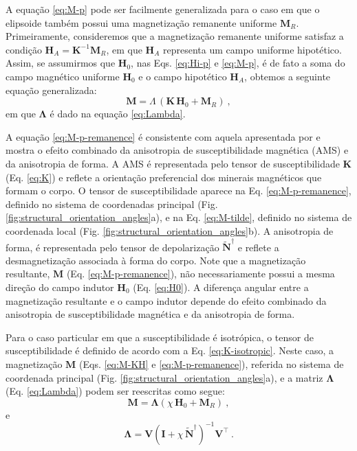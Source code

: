 A equação \ref{eq:M-p} pode ser facilmente generalizada para o caso em que o elipsoide também possui uma magnetização remanente uniforme ${\mathbf{M}}_{R}$. Primeiramente, consideremos que a magnetização remanente uniforme satisfaz a condição ${\mathbf{H}}_{A} = {\mathbf{K}}^{-1} {\mathbf{M}}_{R}$, em que ${\mathbf{H}}_{A}$ representa um campo uniforme hipotético. Assim, se assumirmos que ${\mathbf{H}}_{0}$,
nas Eqs. \ref{eq:Hi-p} e \ref{eq:M-p}, é de fato a soma do campo magnético uniforme ${\mathbf{H}}_{0}$ e o campo hipotético ${\mathbf{H}}_{A}$, obtemos a seguinte equação generalizada:
\begin{equation}
{\mathbf{M}} =  
{\Lambda} \,
\left( {\mathbf{K}} \, {\mathbf{H}}_{0} + {\mathbf{M}}_{R} \right) \: ,
\label{eq:M-p-remanence}
\end{equation}
em que $\mathbf{{\Lambda}}$ é dado na equação \ref{eq:Lambda}.

A equação \ref{eq:M-p-remanence} é consistente com aquela apresentada por \citet[Eq. ~38]{clark1986} e mostra o efeito combinado da anisotropia de susceptibilidade magnética (AMS) e da anisotropia de forma. A AMS é representada pelo tensor de susceptibilidade $\mathbf{K}$ (Eq. \ref{eq:K}) e reflete a orientação preferencial dos minerais magnéticos que formam o corpo. O tensor de susceptibilidade aparece na Eq. \ref{eq:M-p-remanence}, definido no sistema de coordenadas principal (Fig. \ref{fig:structural_orientation_angles}a), e na Eq. \ref{eq:M-tilde}, definido no sistema de coordenada local
(Fig. \ref{fig:structural_orientation_angles}b). A anisotropia de forma, é representada pelo tensor de depolarização $\tilde{\mathbf{N}}^{\dagger}$ e reflete a desmagnetização associada à forma do corpo. Note que a magnetização resultante, $\mathbf{M}$ (Eq. \ref{eq:M-p-remanence}), não necessariamente possui a mesma direção do campo indutor $\mathbf{H}_{0}$
(Eq. \ref{eq:H0}). A diferença angular entre a magnetização resultante e o campo indutor depende do efeito combinado da anisotropia de susceptibilidade magnética e da anisotropia de forma.

Para o caso particular em que a susceptibilidade é isotrópica,
o tensor de susceptibilidade é definido de acordo com a Eq. \ref{eq:K-isotropic}.
Neste caso, a magnetização $\mathbf{M}$ (Eqs. \ref{eq:M-KH} e \ref{eq:M-p-remanence}),
referida no sistema de coordenada principal (Fig. \ref{fig:structural_orientation_angles}a),
e a matriz $\mathbf{\Lambda}$ (Eq. \ref{eq:Lambda})
podem ser reescritas como segue:
\begin{equation}
\mathbf{M} = \mathbf{\Lambda} \left( \chi \, \mathbf{H}_{0} +
\mathbf{M}_{R} \right) \: ,
\label{eq:M-K-isotropic}
\end{equation}
e
\begin{equation}
\mathbf{\Lambda} = \mathbf{V}
\left( \mathbf{I} + \chi \, \tilde{\mathbf{N}}^{\dagger} \right)^{-1}
\mathbf{V}^{\top} \: .
\label{eq:Lambda-K-isotropic}
\end{equation}

